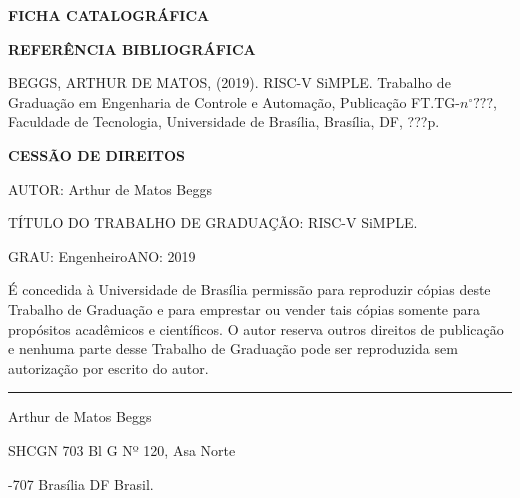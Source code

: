 \noindent \textbf{FICHA CATALOGRÁFICA}

\noindent %

\noindent \medskip{}


\noindent \textbf{REFERÊNCIA BIBLIOGRÁFICA}

BEGGS, ARTHUR DE MATOS, (2019). RISC-V SiMPLE. Trabalho de Graduação
em Engenharia de Controle e Automação, Publicação FT.TG-$n^{\circ}???$,
Faculdade de Tecnologia, Universidade de Brasília, Brasília, DF, ???p.

\noindent \bigskip{}


\noindent \textbf{CESSÃO DE DIREITOS}

\noindent AUTOR: Arthur de Matos Beggs

TÍTULO DO TRABALHO DE GRADUAÇÃO: RISC-V SiMPLE.

\noindent \medskip{}


\noindent GRAU: Engenheiro\hfill{}ANO: 2019\hfill{}

\noindent \medskip{}


É concedida à Universidade de Brasília permissão para reproduzir cópias
deste Trabalho de Graduação e para emprestar ou vender tais cópias
somente para propósitos acadêmicos e científicos. O autor reserva
outros direitos de publicação e nenhuma parte desse Trabalho de Graduação
pode ser reproduzida sem autorização por escrito do autor.

\noindent \bigskip{}


\noindent \rule[0.5ex]{1\columnwidth}{1pt}

\noindent Arthur de Matos Beggs

\noindent SHCGN 703 Bl G Nº 120, Asa Norte

-707 Brasília \textendash{} DF \textendash{} Brasil.
